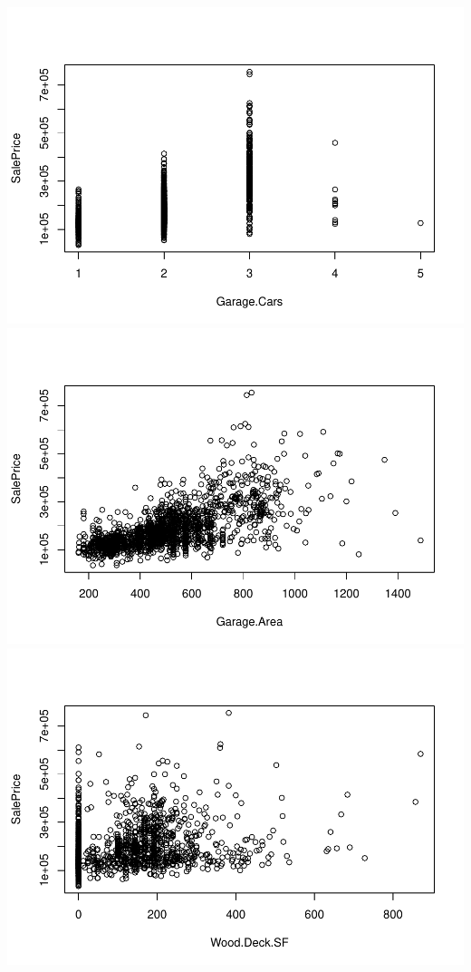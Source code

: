 \documentclass[
]{article}
\begin{document}
\includegraphics{Predicting-Housing-Price_files/figure-latex/unnamed-chunk-2-25.pdf}
\includegraphics{Predicting-Housing-Price_files/figure-latex/unnamed-chunk-2-26.pdf}
\includegraphics{Predicting-Housing-Price_files/figure-latex/unnamed-chunk-2-27.pdf}
\end{document}
